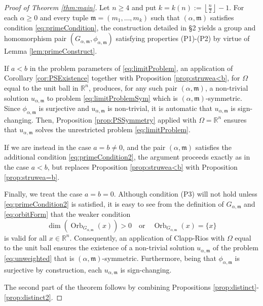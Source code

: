 \documentclass[10pt, reqno]{amsart}
\newcommand{\RR}{\mathbb{R}}
\newcommand{\Om}{\Omega}
\newcommand{\m}{\mathfrak{m}}
\numberwithin{equation}{section}
\theoremstyle{definition}
\theoremstyle{remark}
\theoremstyle{plain}
\begin{document}
	\begin{proof}[Proof of Theorem \ref{thm:main}]
		Let $n \ge 4$ and put $k = k(n) := \left\lfloor \frac{n}{2}\right\rfloor - 1$. For each $\alpha \ge 0$ and every tuple $\m = (m_1,\dots, m_k)$ such that $(\alpha,\m)$ satisfies condition \eqref{eq:primeCondition}, the construction detailed in \S2 yields a group and homomorphism pair $(G_{\alpha,\m}, \phi_{\alpha,\m})$ satisfying properties (P1)-(P2) by virtue of Lemma \ref{lem:primeConstruct}. 
		
		If $a < b$ in the problem parameters of \eqref{eq:limitProblem}, an application of Corollary \ref{cor:PSExistence} together with Proposition \ref{prop:struwea<b}, for $\Om$ equal to the unit ball in $\RR^n$, produces, for any such pair $(\alpha,\m)$, a non-trivial solution $u_{\alpha,\m}$ to problem \eqref{eq:limitProblemSym}  which is $(\alpha,\m)$-symmetric. Since $\phi_{\alpha,\m}$ is surjective and $u_{\alpha,\m}$ is non-trivial, it is automatic that $u_{\alpha,\m}$ is sign-changing. Then, Proposition \ref{prop:PSSymmetry} applied with $\Om = \RR^n$ ensures that $u_{\alpha,\m}$ solves the unrestricted problem \eqref{eq:limitProblem}. 
		
		If we are instead in the case $a=b \ne 0$, and the pair $(\alpha,\m)$ satisfies the additional condition \eqref{eq:primeCondition2}, the argument proceeds exactly as in the case $a < b$, but replaces Proposition \ref{prop:struwea<b} with Proposition \ref{prop:struwea=b}.
		
		Finally, we treat the case $a=b=0$. Although condition (P3) will not hold unless \eqref{eq:primeCondition2} is satisfied, it is easy to see from the definition of $G_{\alpha,\m}$ and \eqref{eq:orbitForm} that the weaker condition
		\[
		\dim \left( \operatorname{Orb}_{G_{\alpha,\m}}(x)\right) > 0 \quad \text{or}
		\quad \operatorname{Orb}_{G_{\alpha,\m}}(x) = \{x\}
		\]
		is valid for all $x \in \RR^n$. Consequently, an application of Clapp-Rios \cite[Theorem 3.1]{clappRios} with $\Om$ equal to the unit ball ensures the existence of a non-trivial solution $u_{\alpha,\m}$ of the problem \eqref{eq:unweighted} that is $(\alpha,\m)$-symmetric. Furthermore, being that $\phi_{\alpha,\m}$ is surjective by construction, each $u_{\alpha,\m}$ is sign-changing. 
		
		The second part of the theorem follows by combining Propositions \ref{prop:distinct}-\ref{prop:distinct2}.
		
	\end{proof}
	
	
	
	
\end{document}
